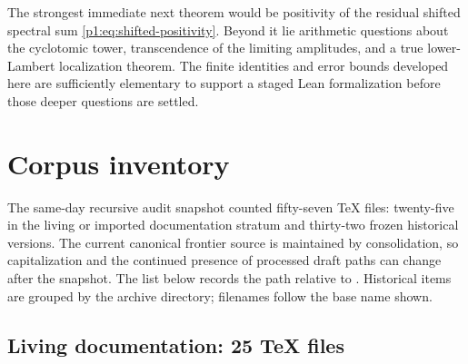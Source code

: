 \documentclass[11pt,oneside]{article}
\theoremstyle{definition}
\theoremstyle{remark}
\begin{document}
The strongest immediate next theorem would be positivity of the residual
shifted spectral sum \eqref{p1:eq:shifted-positivity}.  Beyond it lie arithmetic
questions about the cyclotomic tower, transcendence of the limiting amplitudes,
and a true lower-Lambert localization theorem.  The finite identities and error
bounds developed here are sufficiently elementary to support a staged Lean
formalization before those deeper questions are settled.

\appendix

\section{Corpus inventory}\label{p1:app:inventory}

The same-day recursive audit snapshot counted fifty-seven TeX files: twenty-five in the living or imported documentation stratum and thirty-two frozen historical versions.  The current canonical frontier source is maintained by consolidation, so capitalization and the continued presence of processed draft paths can change after the snapshot. The list below records the path
relative to . Historical items are grouped by
the archive directory; filenames follow the base name shown.

\subsection{Living documentation: 25 TeX files}
\end{document}
